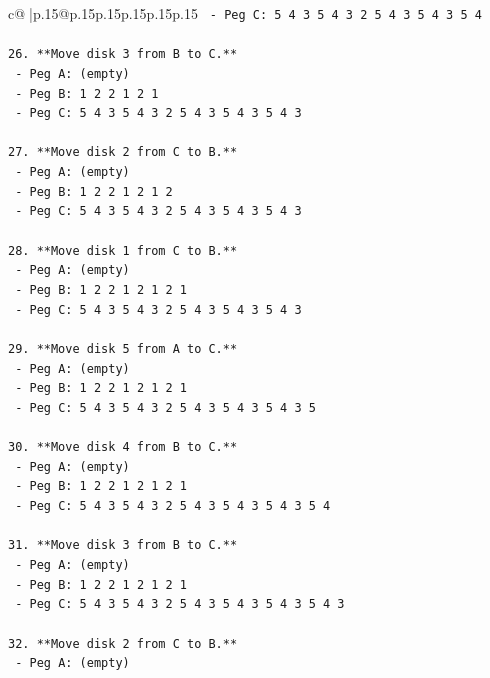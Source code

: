 \documentclass{article}
\begin{document}
{\begin{supertabular}{c@{$\;$}|p{.15\linewidth}@{}p{.15\linewidth}p{.15\linewidth}p{.15\linewidth}p{.15\linewidth}p{.15\linewidth}}
{{{\texttt{    {-} Peg C: 5 4 3 5 4 3 2 5 4 3 5 4 3 5 4} \\
\\ 
\texttt{26. **Move disk 3 from B to C.**} \\
\texttt{    {-} Peg A: (empty)} \\
\texttt{    {-} Peg B: 1 2 2 1 2 1} \\
\texttt{    {-} Peg C: 5 4 3 5 4 3 2 5 4 3 5 4 3 5 4 3} \\
\\ 
\texttt{27. **Move disk 2 from C to B.**} \\
\texttt{    {-} Peg A: (empty)} \\
\texttt{    {-} Peg B: 1 2 2 1 2 1 2} \\
\texttt{    {-} Peg C: 5 4 3 5 4 3 2 5 4 3 5 4 3 5 4 3} \\
\\ 
\texttt{28. **Move disk 1 from C to B.**} \\
\texttt{    {-} Peg A: (empty)} \\
\texttt{    {-} Peg B: 1 2 2 1 2 1 2 1} \\
\texttt{    {-} Peg C: 5 4 3 5 4 3 2 5 4 3 5 4 3 5 4 3} \\
\\ 
\texttt{29. **Move disk 5 from A to C.**} \\
\texttt{    {-} Peg A: (empty)} \\
\texttt{    {-} Peg B: 1 2 2 1 2 1 2 1} \\
\texttt{    {-} Peg C: 5 4 3 5 4 3 2 5 4 3 5 4 3 5 4 3 5} \\
\\ 
\texttt{30. **Move disk 4 from B to C.**} \\
\texttt{    {-} Peg A: (empty)} \\
\texttt{    {-} Peg B: 1 2 2 1 2 1 2 1} \\
\texttt{    {-} Peg C: 5 4 3 5 4 3 2 5 4 3 5 4 3 5 4 3 5 4} \\
\\ 
\texttt{31. **Move disk 3 from B to C.**} \\
\texttt{    {-} Peg A: (empty)} \\
\texttt{    {-} Peg B: 1 2 2 1 2 1 2 1} \\
\texttt{    {-} Peg C: 5 4 3 5 4 3 2 5 4 3 5 4 3 5 4 3 5 4 3} \\
\\ 
\texttt{32. **Move disk 2 from C to B.**} \\
\texttt{    {-} Peg A: (empty)} \\
}}}
\end{supertabular}}
\end{document}
